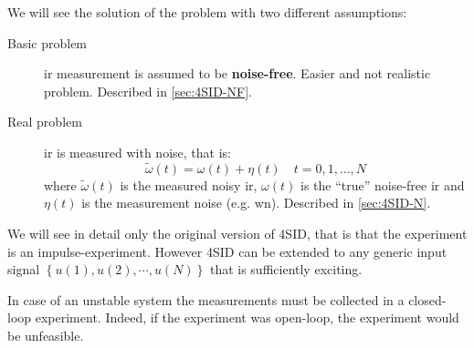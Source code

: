 We will see the solution of the problem with two different assumptions:
\begin{description}
    \item [Basic problem] \gls{ir} measurement is assumed to be \textbf{noise-free}. Easier and not realistic problem. Described in \ref{sec:4SID-NF}.
    \item [Real problem] \gls{ir} is measured with noise, that is:
    \[ \widetilde{\omega}(t) = \omega(t) + \eta(t) \quad t = 0, 1,\dots, N \] where
        $\widetilde{\omega}(t)$ is the measured noisy \gls{ir},
        $\omega(t)$ is the ``true'' noise-free \gls{ir} and
        $\eta(t)$ is the measurement noise (e.g. \gls{wn}). Described in \ref{sec:4SID-N}.
\end{description}

\begin{rem}
    We will see in detail only the original version of 4SID, that is that the experiment is an impulse-experiment.
    However 4SID can be extended to any generic input signal $\left\{ u(1), u(2), \cdots, u(N) \right\}$ that is sufficiently exciting.
\end{rem}

\begin{rem}
    In case of an unstable system the measurements must be collected in a closed-loop experiment.
    Indeed, if the experiment was open-loop, the experiment would be unfeasible.

    \begin{figure}[H]
        \centering
    \end{figure}
\end{rem}

